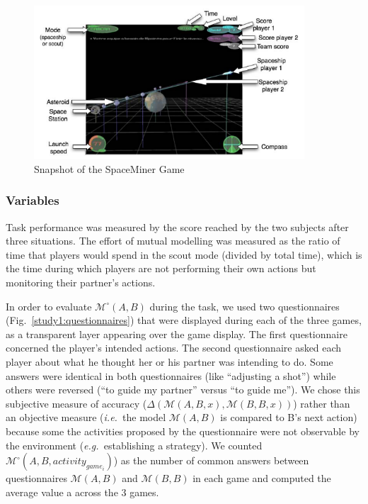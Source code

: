 \documentclass[twocolumn]{article}
\newcommand{\ie}{{\textit{i.e.\ }}}
\newcommand{\eg}{{\textit{e.g.\ }}}
\newcommand{\M}[3]{{\mathcal{M}(#1, #2, #3)}}
\newcommand{\gmodel}[2]{{$\mathcal{M}(#1, #2)$}}
\newcommand{\Model}[3]{{$\mathcal{M}^{\circ}(#1, #2, #3)$}}
\newcommand{\gModel}[2]{{$\mathcal{M}^{\circ}(#1, #2)$}}
\begin{document}
\begin{figure}
        \centering
        \includegraphics[width=0.9\textwidth]{image4.png}
        \caption{Snapshot of the SpaceMiner Game}
        \label{study1:spaceminer}
\end{figure}

\subsubsection*{Variables}

Task performance was measured by the score reached by the two subjects after
three situations. The effort of mutual modelling was measured as the ratio of
time that players would spend in the scout mode (divided by total time), which
is the time during which players are not performing their own actions but
monitoring their partner's actions.

In order to evaluate \gModel{A}{B} during the task, we used two questionnaires
(Fig.~\ref{study1:questionnaires}) that were displayed during each of the three
games, as a transparent layer appearing over the game display. The first
questionnaire concerned the player's intended actions. The second questionnaire
asked each player about what he thought her or his partner was intending to do.
Some answers were identical in both questionnaires (like ``adjusting a shot'')
while others were reversed (``to guide my partner'' versus ``to guide me''). We
chose this subjective measure of accuracy ($\Delta(\M{A}{B}{x}, \M{B}{B}{x})$)
rather than an objective measure (\ie the model \gmodel{A}{B} is compared to B's
next action) because some the activities proposed by the questionnaire were not
observable by the environment (\eg establishing a strategy). We counted
\Model{A}{B}{activity_{game_{i}}}) as the number of common answers between
questionnaires \gmodel{A}{B} and \gmodel{B}{B} in each game and computed the
average value a across the 3 games.
\end{document}
